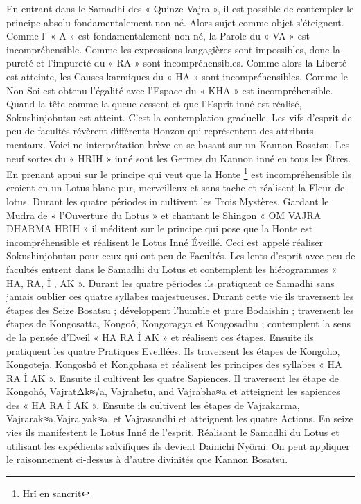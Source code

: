 En entrant dans le Samadhi des « Quinze Vajra », il est possible de contempler le principe absolu fondamentalement non-né. Alors sujet comme objet s’éteignent. Comme l’ « A » est fondamentalement non-né, la Parole du « VA » est incompréhensible. Comme les expressions langagières sont impossibles, donc la pureté et l’impureté du « RA » sont incompréhensibles. Comme alors la Liberté est atteinte, les Causes karmiques du « HA » sont incompréhensibles. Comme le Non-Soi est obtenu l’égalité avec l’Espace du « KHA » est incompréhensible. Quand la tête comme la queue cessent et que l’Esprit inné est réalisé, Sokushinjobutsu est atteint. C’est la contemplation graduelle.
Les vifs d’esprit de peu de facultés révèrent différents Honzon qui représentent des attributs mentaux.
Voici ne interprétation brève en se basant sur un Kannon Bosatsu. Les neuf sortes du « HRIH » inné sont les Germes du Kannon inné en tous les Êtres. En prenant appui sur le principe qui veut que la Honte \footnote{Hrî en sancrit} est incompréhensible ils croient en un Lotus blanc pur, merveilleux et sans tache et réalisent la Fleur de lotus. Durant les quatre périodes in cultivent les Trois Mystères. Gardant le Mudra de « l’Ouverture du Lotus » et chantant le Shingon « OM VAJRA DHARMA HRIH » il méditent sur le principe qui pose que la Honte est incompréhensible et réalisent le Lotus Inné Éveillé. Ceci est appelé réaliser Sokushinjobutsu pour ceux qui ont peu de Facultés.
Les lents d’esprit avec peu de facultés entrent dans le Samadhi du Lotus et contemplent les hiérogrammes « HA, RA, Î , AK ». Durant les quatre périodes ils pratiquent ce Samadhi sans jamais oublier ces quatre syllabes majestueuses. Durant cette vie ils traversent les étapes des Seize Bosatsu ; développent l’humble et pure Bodaishin ; traversent les étapes de Kongosatta, Kongoô, Kongoragya et Kongosadhu ; contemplent la sens de la pensée d’Eveil « HA RA Î AK » et réalisent ces étapes. Ensuite ils pratiquent les quatre Pratiques Eveillées. Ils traversent les étapes de Kongoho, Kongoteja, Kongoshô et Kongohasa et réalisent les principes des syllabes « HA RA Î AK ». Ensuite il cultivent les quatre Sapiences. Il traversent les étape de Kongohô, VajratΔk≈√a, Vajrahetu, and Vajrabha≈a et atteignent les sapiences des « HA RA Î AK ». Ensuite ils cultivent les étapes de Vajrakarma, Vajrarak≈a,Vajra yak≈a, et Vajrasandhi et atteignent les quatre Actions. En seize vies ils manifestent le Lotus Inné de l’esprit. Réalisant le Samadhi du Lotus et utilisant les expédients salvifiques ils devient Dainichi Nyôrai.
On peut appliquer le raisonnement ci-dessus à d’autre divinités que Kannon Bosatsu.
